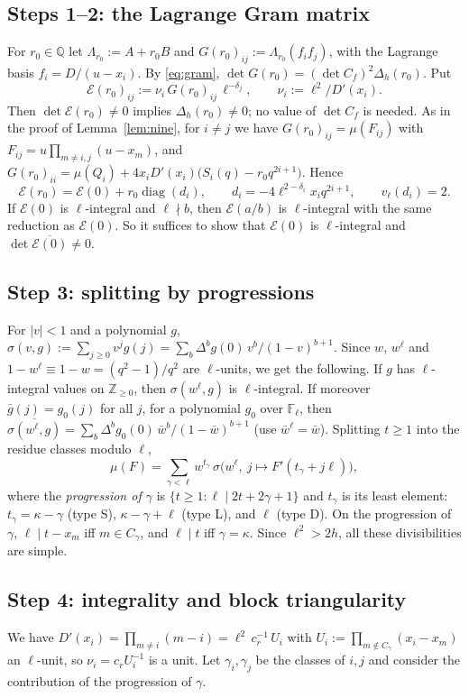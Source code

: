 \documentclass[11pt]{amsart}
\theoremstyle{definition}
\theoremstyle{remark}
\numberwithin{equation}{section}
\newcommand{\ZZ}{\mathbb{Z}}
\newcommand{\QQ}{\mathbb{Q}}
\newcommand{\FF}{\mathbb{F}}
\begin{document}
\subsection{Steps 1--2: the Lagrange Gram matrix}
For $r_0\in\QQ$ let $\Lambda_{r_0}:=A+r_0B$ and $G(r_0)_{ij}:=\Lambda_{r_0}(f_if_j)$, with the Lagrange basis $f_i=D/(u-x_i)$. By
\eqref{eq:gram}, $\det G(r_0)=(\det C_f)^2\Delta_h(r_0)$. Put
\[
  \mathcal E(r_0)_{ij}:=\nu_i\,G(r_0)_{ij}\,\ell^{-\delta_j},\qquad \nu_i:=\ell^2/D'(x_i).
\]
Then $\det\mathcal E(r_0)\ne0$ implies $\Delta_h(r_0)\ne0$; no value of $\det C_f$ is needed. As in the proof of
Lemma~\ref{lem:nine}, for $i\ne j$ we have $G(r_0)_{ij}=\mu(F_{ij})$ with $F_{ij}=u\prod_{m\ne i,j}(u-x_m)$, and
$G(r_0)_{ii}=\mu(Q_i)+4x_iD'(x_i)\bigl(S_i(q)-r_0q^{2i+1}\bigr)$. Hence
\[
  \mathcal E(r_0)=\mathcal E(0)+r_0\operatorname{diag}(d_i),\qquad d_i=-4\ell^{2-\delta_i}x_iq^{2i+1},\qquad v_\ell(d_i)=2 .
\]
If $\mathcal E(0)$ is $\ell$-integral and $\ell\nmid b$, then $\mathcal E(a/b)$ is $\ell$-integral with the same reduction as $\mathcal E(0)$.
So it suffices to show that $\mathcal E(0)$ is $\ell$-integral and $\det\overline{\mathcal E(0)}\ne0$.

\subsection{Step 3: splitting by progressions}
For $|v|<1$ and a polynomial $g$, $\sigma(v,g):=\sum_{j\ge0}v^jg(j)=\sum_b\Delta^bg(0)\,v^b/(1-v)^{b+1}$. Since $w$, $w^\ell$ and
$1-w^\ell\equiv1-w=(q^2-1)/q^2$ are $\ell$-units, we get the following. If $g$ has $\ell$-integral values on $\ZZ_{\ge0}$, then
$\sigma(w^\ell,g)$ is $\ell$-integral. If moreover $\bar g(j)=g_0(j)$ for all $j$, for a polynomial $g_0$ over $\FF_\ell$, then
$\overline{\sigma(w^\ell,g)}=\sum_b\Delta^bg_0(0)\,\bar w^b/(1-\bar w)^{b+1}$ (use $\bar w^\ell=\bar w$). Splitting $t\ge1$ into the
residue classes modulo $\ell$,
\[
  \mu(F)=\sum_{\gamma<\ell}w^{t_\gamma}\,\sigma\bigl(w^\ell,\ j\mapsto F'(t_\gamma+j\ell)\bigr),
\]
where the \emph{progression of $\gamma$} is $\{t\ge1:\ell\mid2t+2\gamma+1\}$ and $t_\gamma$ is its least element: $t_\gamma=\kappa-\gamma$
(type S), $\kappa-\gamma+\ell$ (type L), and $\ell$ (type D). On the progression of $\gamma$, $\ell\mid t-x_m$ iff $m\in C_\gamma$,
and $\ell\mid t$ iff $\gamma=\kappa$. Since $\ell^2>2h$, all these divisibilities are simple.

\subsection{Step 4: integrality and block triangularity}
We have $D'(x_i)=\prod_{m\ne i}(m-i)=\ell^2\,c_r^{-1}\,U_i$ with $U_i:=\prod_{m\notin C_\gamma}(x_i-x_m)$ an $\ell$-unit, so
$\nu_i=c_rU_i^{-1}$ is a unit. Let $\gamma_i,\gamma_j$ be the classes of $i,j$ and consider the contribution of the
progression of $\gamma$.
\end{document}
